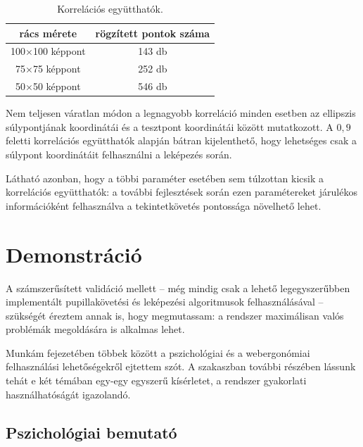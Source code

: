 \begin{table}[ht]
	\centering
	\caption{Korrelációs együtthatók.} \label{tab:korrel}
	\begin{tabular}{ c | c }
	rács mérete & rögzített pontok száma \\ \hline \hline
	100$\times$100 képpont & 143 db \\
	75$\times$75 képpont & 252 db \\
	50$\times$50 képpont & 546 db \\
	\end{tabular}
\end{table}

Nem teljesen váratlan módon a legnagyobb korreláció minden esetben az ellipszis súlypontjának koordinátái és a tesztpont koordinátái között mutatkozott. A $0,\!9$ feletti korrelációs együtthatók alapján bátran kijelenthető, hogy lehetséges csak a súlypont koordinátáit felhasználni a leképezés során.

Látható azonban, hogy a többi paraméter esetében sem túlzottan kicsik a korrelációs együtthatók: a további fejlesztések során ezen paramétereket járulékos információként felhasználva a tekintetkövetés pontossága növelhető lehet.

\section{Demonstráció}\label{sect:kiserletek}

A számszerűsített validáció mellett -- még mindig csak a lehető legegyszerűbben implementált pupillakövetési és leképezési algoritmusok felhasználásával -- szükségét éreztem annak is, hogy megmutassam: a rendszer maximálisan valós problémák megoldására is alkalmas lehet.

Munkám  fejezetében többek között a pszichológiai és a webergonómiai felhasználási lehetőségekről ejtettem szót. A szakaszban további részében lássunk tehát e két témában egy-egy egyszerű kísérletet, a rendszer gyakorlati használhatóságát igazolandó. 

\subsection{Pszichológiai bemutató}\label{sect:pszicho}

